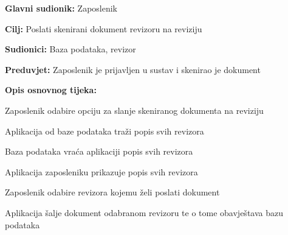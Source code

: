 					\noindent {}
					\begin{packed_item}
	
						\item \textbf{Glavni sudionik:} Zaposlenik
						\item  \textbf{Cilj:} Poslati skenirani dokument revizoru na reviziju
						\item  \textbf{Sudionici:} Baza podataka, revizor
						\item  \textbf{Preduvjet:} Zaposlenik je prijavljen u sustav i skenirao je dokument
						\item  \textbf{Opis osnovnog tijeka:}
						
						\item[] \begin{packed_enum}
	
							\item Zaposlenik odabire opciju za slanje skeniranog dokumenta na reviziju
							\item Aplikacija od baze podataka traži popis svih revizora
							\item Baza podataka vraća aplikaciji popis svih revizora
							\item Aplikacija zaposleniku prikazuje popis svih revizora
							\item Zaposlenik odabire revizora kojemu želi poslati dokument
							\item Aplikacija šalje dokument odabranom revizoru te o tome obavještava bazu podataka

						\end{packed_enum}

					\end{packed_item}


